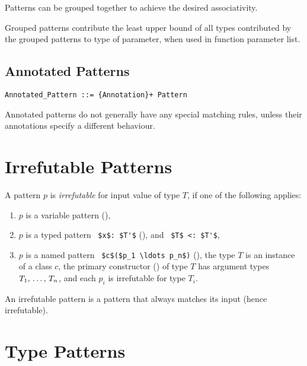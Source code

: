 Patterns can be grouped together to achieve the desired associativity. 

Grouped patterns contribute the least upper bound of all types contributed by the grouped patterns to type of parameter, when used in function parameter list. 





\subsection{Annotated Patterns}
\label{sec:annotated-patterns}

\grammar\begin{lstlisting}
Annotated_Pattern ::= {Annotation}+ Pattern
\end{lstlisting}

Annotated patterns do not generally have any special matching rules, unless their annotations specify a different behaviour. 





\section{Irrefutable Patterns}
\label{sec:irrefutable-patterns}

A pattern $p$ is {\em irrefutable} for input value of type $T$, if one of the following applies: 
\begin{enumerate}
  \item $p$ is a variable pattern (),
  \item $p$ is a typed pattern ~\lstinline!$x$: $T'$! (), and ~\lstinline!$T$ <: $T'$!,
  \item $p$ is a named pattern ~\lstinline!$c$($p_1 \ldots p_n$)! (), the type $T$ is an instance of a class $c$, the primary constructor () of type $T$ has argument types $T_1 ,\, \ldots ,\, T_n$, and each $p_i$ is irrefutable for type $T_i$. 
\end{enumerate}

An irrefutable pattern is a pattern that always matches its input (hence irrefutable). 






\section{Type Patterns}
\label{sec:type-patterns}

